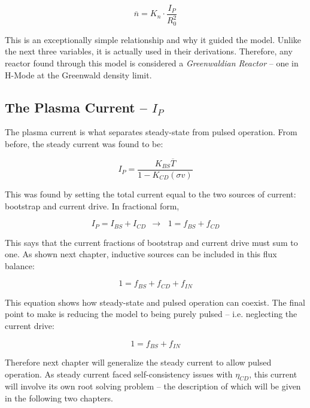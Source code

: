 \documentclass[11pt]{book}
\begin{document}
\begin{equation}
	\label{eq:nbar}
	\overline n = K_n \cdot \frac{I_P}{R_0^2}
\end{equation}

This is an exceptionally simple relationship and why it guided the model. Unlike the next three variables, it is actually used in their derivations. Therefore, any reactor found through this model is considered a \emph{Greenwaldian Reactor} -- one in H-Mode at the Greenwald density limit.

\subsection{The Plasma Current -- $I_P$}

The plasma current is what separates steady-state from pulsed operation. From before, the steady current was found to be:

\begin{equation}
	\label{eq:steady}
	I_P = \frac{K_{BS} \overline T}{1 - K_{CD} ( \sigma v ) }
\end{equation}

This was found by setting the total current equal to the two sources of current: bootstrap and current drive. In fractional form,

\begin{equation}
	I_P = I_{BS} + I_{CD} \ \ \rightarrow \, \ \ 1 = f_{BS} + f_{CD}
\end{equation}

This says that the current fractions of bootstrap and current drive must sum to one. As shown next chapter, inductive sources can be included in this flux balance:

\begin{equation}
	1 = f_{BS} + f_{CD} + f_{IN}
\end{equation}

This equation shows how steady-state and pulsed operation can coexist. The final point to make is reducing the model to being purely pulsed -- i.e. neglecting the current drive:

\begin{equation}
	1 = f_{BS} + f_{IN}
\end{equation}

Therefore next chapter will generalize the steady current to allow pulsed operation. As steady current faced self-consistency issues with $\eta_{CD}$, this current will involve its own root solving problem -- the description of which will be given in the following two chapters.
\end{document}
